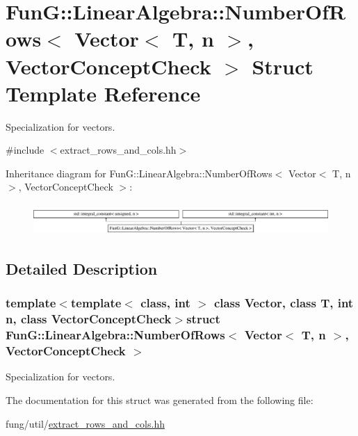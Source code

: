 \hypertarget{structFunG_1_1LinearAlgebra_1_1NumberOfRows_3_01Vector_3_01T_00_01n_01_4_00_01VectorConceptCheck_01_4}{\section{\-Fun\-G\-:\-:\-Linear\-Algebra\-:\-:\-Number\-Of\-Rows$<$ \-Vector$<$ \-T, n $>$, \-Vector\-Concept\-Check $>$ \-Struct \-Template \-Reference}
\label{structFunG_1_1LinearAlgebra_1_1NumberOfRows_3_01Vector_3_01T_00_01n_01_4_00_01VectorConceptCheck_01_4}
}


\-Specialization for vectors.  




{\ttfamily \#include $<$extract\-\_\-rows\-\_\-and\-\_\-cols.\-hh$>$}

\-Inheritance diagram for \-Fun\-G\-:\-:\-Linear\-Algebra\-:\-:\-Number\-Of\-Rows$<$ \-Vector$<$ \-T, n $>$, \-Vector\-Concept\-Check $>$\-:\begin{figure}[H]
\begin{center}
\leavevmode
\includegraphics[height=1.188960cm]{structFunG_1_1LinearAlgebra_1_1NumberOfRows_3_01Vector_3_01T_00_01n_01_4_00_01VectorConceptCheck_01_4}
\end{center}
\end{figure}


\subsection{\-Detailed \-Description}
\subsubsection*{template$<$template$<$ class, int $>$ class \-Vector, class T, int n, class Vector\-Concept\-Check$>$struct Fun\-G\-::\-Linear\-Algebra\-::\-Number\-Of\-Rows$<$ Vector$<$ T, n $>$, Vector\-Concept\-Check $>$}

\-Specialization for vectors. 

\-The documentation for this struct was generated from the following file\-:\begin{DoxyCompactItemize}
\item 
fung/util/\hyperlink{extract__rows__and__cols_8hh}{extract\-\_\-rows\-\_\-and\-\_\-cols.\-hh}\end{DoxyCompactItemize}
